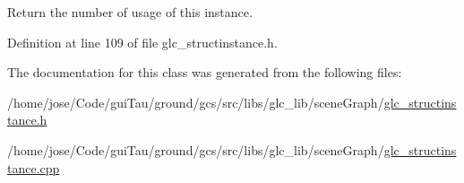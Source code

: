 Return the number of usage of this instance. 



Definition at line 109 of file glc\-\_\-structinstance.\-h.



The documentation for this class was generated from the following files\-:\begin{DoxyCompactItemize}
\item 
/home/jose/\-Code/gui\-Tau/ground/gcs/src/libs/glc\-\_\-lib/scene\-Graph/\hyperlink{glc__structinstance_8h}{glc\-\_\-structinstance.\-h}\item 
/home/jose/\-Code/gui\-Tau/ground/gcs/src/libs/glc\-\_\-lib/scene\-Graph/\hyperlink{glc__structinstance_8cpp}{glc\-\_\-structinstance.\-cpp}\end{DoxyCompactItemize}
